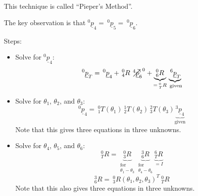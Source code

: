 \documentclass[]{article}
\newcommand{\crossout}[1]{\mathbin{\ooalign{${#1}$\cr\larger[1]{$\nearrow$}\cr}}}
\begin{document}
 This technique is called ``Pieper's Method''.
 
 The key observation is that $^{0}\underline{p}_{4} = \ \!^{0}\underline{p}_{5} = \ \!^{0}\underline{p}_{6}$.
 
 Steps:
 
 \begin{itemize}
 	\item Solve for $^{0}\underline{p}_{4}$:
 	\begin{displaymath} ^{0}\underline{p}_{T} = \ \!^{0}\underline{p}_{4} + \ \!^{0}_{4}R\ \!\crossout{^{4}\underline{p}_{6}}^{0} + \underbrace{^{0}_{6}R}_{=\ \!^{0}_{T}R}\underbrace{\ \!^{6}\underline{p}_{T}}_{\text{\ given}} \end{displaymath}
 	\item Solve for $\theta_{1}$, $\theta_{2}$, and $\theta_{3}$:
 	\begin{displaymath} ^{0}\underline{p}_{4} = \ \!^{0}_{1}T(\theta_{1})\ \!^{1}_{2}T(\theta_{2})\ \!^{2}_{3}T(\theta_{3})\underbrace{^{3}\underline{p}_{4}}_{\text{given}} \end{displaymath}
 	Note that this gives three equations in three unknowns.
 	\item Solve for $\theta_{4}$, $\theta_{5}$, and $\theta_{6}$:
 	\begin{displaymath}
 	^{0}_{T}R = \underbrace{^{0}_{3}R}_{\substack{\text{for}\\\theta_{1}-\theta_{3}}}\underbrace{^{3}_{6}R}_{\substack{\text{for}\\\theta_{4}-\theta_{6}}}\underbrace{^{6}_{T}R}_{=I}
 	\end{displaymath}
 	\begin{displaymath}
 		^{3}_{6}R = \ \!^{0}_{3}R(\theta_{1}, \theta_{2}, \theta_{3})^{T}\ \!^{0}_{T}R
 	\end{displaymath}
 	Note that this also gives three equations in three unknowns.
 \end{itemize}
 
\end{document}
